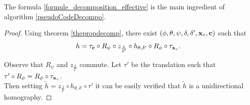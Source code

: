 \begin{remarque}
The formula \eqref{formule_decomposition_effective} is the main ingredient of algorithm \ref{pseudoCodeDecompo}.
\end{remarque}


\begin{proof}
	 Using theorem \ref{thepropdecomp}, there exist $(\phi,\theta,\psi,\delta,\delta',\mathbf{x}_v,\mathbf{c})$ such that 
	 \begin{equation*}
	 h = \tau_{\mathbf{c}} \circ R_{\psi} \circ z_{\frac{\delta}{\delta'}} \circ h_{\theta,\delta'} \circ R_{\phi} \circ \tau_{\mathbf{x}_v}.
	 \end{equation*}
	 
\noindent Observe that $R_\psi$ and $z_{\frac{\delta}{\delta'}}$ commute. Let $\tau'$ be the translation such that $\tau' \circ R_\phi =  R_\phi \circ \tau_{\mathbf{x}_v}$.\\
	 Then setting $\tilde{h} = z_{\frac{\delta}{\delta'}} \circ h_{\theta,\delta'} \circ \tau'$ it can be easily verified that $\tilde{h}$ is a unidirectional homography.
	 \end{proof}
	\label{ref_schema_decomp_cool}
